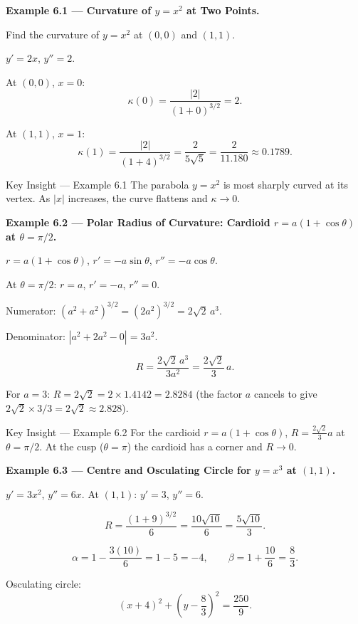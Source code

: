 \documentclass[12pt,a4paper]{article}
\begin{document}
\textbf{Example 6.1 --- Curvature of $y = x^2$ at Two Points.}

Find the curvature of $y = x^{2}$ at $(0,0)$ and $(1,1)$.

$y' = 2x$, $y'' = 2$.

At $(0,0)$, $x=0$:
\[
  \kappa(0) = \frac{|2|}{(1+0)^{3/2}} = 2.
\]

At $(1,1)$, $x=1$:
\[
  \kappa(1) = \frac{|2|}{(1+4)^{3/2}} = \frac{2}{5\sqrt{5}} = \frac{2}{11.180} \approx 0.1789.
\]

\begin{learnbox}{Key Insight --- Example 6.1}
The parabola $y=x^2$ is most sharply curved at its vertex. As $|x|$ increases, the curve flattens and $\kappa \to 0$.
\end{learnbox}

\bigskip
\textbf{Example 6.2 --- Polar Radius of Curvature: Cardioid $r = a(1+\cos\theta)$ at $\theta = \pi/2$.}

$r = a(1+\cos\theta)$, $r' = -a\sin\theta$, $r'' = -a\cos\theta$.

At $\theta = \pi/2$: $r = a$, $r' = -a$, $r'' = 0$.

Numerator: $(a^{2}+a^{2})^{3/2} = (2a^{2})^{3/2} = 2\sqrt{2}\,a^{3}$.

Denominator: $|a^{2}+2a^{2}-0| = 3a^{2}$.

\[
  R = \frac{2\sqrt{2}\,a^{3}}{3a^{2}} = \frac{2\sqrt{2}}{3}\,a.
\]

For $a = 3$: $R = 2\sqrt{2} = 2\times 1.4142 = 2.8284$ (the factor $a$ cancels to give $2\sqrt{2}\times 3/3 = 2\sqrt{2}\approx 2.828$).

\begin{learnbox}{Key Insight --- Example 6.2}
For the cardioid $r = a(1+\cos\theta)$, $R = \tfrac{2\sqrt{2}}{3}a$ at $\theta=\pi/2$. At the cusp ($\theta=\pi$) the cardioid has a corner and $R\to 0$.
\end{learnbox}

\bigskip
\textbf{Example 6.3 --- Centre and Osculating Circle for $y = x^3$ at $(1,1)$.}

$y' = 3x^{2}$, $y'' = 6x$. At $(1,1)$: $y'=3$, $y''=6$.

\[
  R = \frac{(1+9)^{3/2}}{6} = \frac{10\sqrt{10}}{6} = \frac{5\sqrt{10}}{3}.
\]

\[
  \alpha = 1 - \frac{3(10)}{6} = 1 - 5 = -4, \qquad \beta = 1 + \frac{10}{6} = \frac{8}{3}.
\]

Osculating circle:
\[
  (x+4)^{2} + \left(y - \frac{8}{3}\right)^{2} = \frac{250}{9}.
\]
\end{document}
